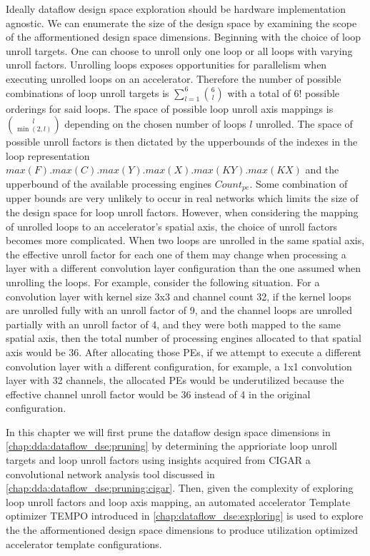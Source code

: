 Ideally dataflow design space exploration should be hardware implementation
agnostic. We can enumerate the size of the design space by examining the scope
of the afformentioned design space dimensions. Beginning with the choice of loop
unroll targets. One can choose to unroll only one loop or all loops with
varying unroll factors. Unrolling loops exposes opportunities for parallelism
when executing unrolled loops on an accelerator. Therefore the number of
possible combinations of loop unroll targets is
$\sum\limits_{l=1}^{6}\binom{6}{l}$ with a total of $6!$ possible orderings for
said loops. The space of possible loop unroll axis mappings is $\binom{l}{\min(2,
l)}$ depending on the chosen number of loops $l$ unrolled. The space of possible
unroll factors is then dictated by the upperbounds of the indexes in the loop
representation $max(F).max(C).max(Y).max(X).max(KY).max(KX)$ and the upperbound
of the available processing engines $Count_{pe}$. Some combination of upper
bounds are very unlikely to occur in real networks which limits the size of the
design space for loop unroll factors. However, when considering the
mapping of unrolled loops to an accelerator's spatial axis, the choice of unroll
factors becomes more complicated. When two loops are unrolled in the same
spatial axis, the effective unroll factor for each one of them may change when
processing a layer with a different convolution layer configuration than the one
assumed when unrolling the loops. For example, consider the following situation.
For a convolution layer with kernel size 3x3 and channel count 32, if the kernel
loops are unrolled fully with an unroll factor of 9, and the channel loops are
unrolled partially with an unroll factor of 4, and they were both mapped to the
same spatial axis, then the total number of processing engines allocated to that
spatial axis would be 36. After allocating those PEs, if we attempt to execute a
different convolution layer with a different configuration, for example, a 1x1
convolution layer with 32 channels, the allocated PEs would be underutilized because
the effective channel unroll factor would be 36 instead of 4 in the original
configuration.

In this chapter we will first prune the dataflow design space dimensions in
\autoref{chap:dda:dataflow_dse:pruning} by determining the apprioriate
loop unroll targets and loop unroll factors using insights acquired from
\ac{CIGAR} a convolutional network analysis tool discussed in
\autoref{chap:dda:dataflow_dse:pruning:cigar}. Then, given the complexity of
exploring loop unroll factors and loop axis mapping, an automated accelerator
Template optimizer TEMPO introduced in \autoref{chap:dataflow_dse:exploring} is
used to explore the the afformentioned design space dimensions to produce
utilization optimized accelerator template configurations. 

